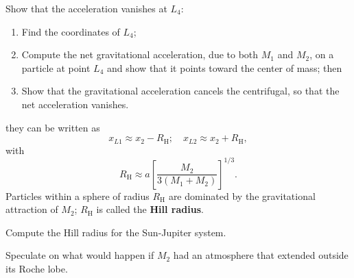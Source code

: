 \begin{exercisebox}
Show that the acceleration vanishes at $L_{4}$:
\begin{enumerate}\renewcommand{\labelenumi}{\alph{enumi})}
   \item Find the coordinates of $L_{4}$;
   \item Compute the net gravitational acceleration, due to both $M_{1}$ and $M_{2}$, on a particle at point $L_{4}$ and show that it points toward the center of mass; then
   \item Show that the gravitational acceleration cancels the centrifugal, so that the net acceleration vanishes.
\end{enumerate}
\end{exercisebox}

 they can be written
as
\[ 
	x_{L1} \approx x_{2} - R_{\mathrm{H}};\quad x_{L2}\approx x_{2} + R_{\mathrm{H}},
\]
with
\[ R_{\mathrm{H}}\approx a\left[\frac{M_{2}}{3(M_{1}+M_{2})}\right]^{1/3}. \]
Particles within a sphere of radius $R_{\mathrm{H}}$ are dominated by the gravitational attraction of $M_{2}$; $R_{\mathrm{H}}$ is called the \textbf{Hill radius}.

\begin{exercisebox}
Compute the Hill radius for the Sun-Jupiter system.
\end{exercisebox}

\begin{exercisebox}
Speculate on what would happen if $M_{2}$ had an atmosphere that extended outside its Roche lobe.
\end{exercisebox}

